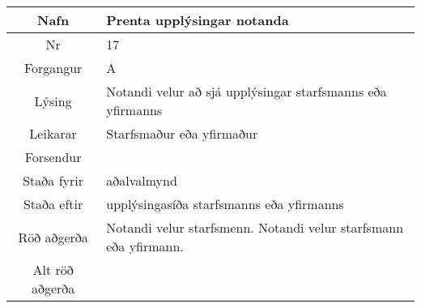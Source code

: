 \documentclass[a4paper]{article}
\begin{document}
\begin{tabular}{|c|p{10cm}|}
\hline
Nafn&Prenta upplýsingar notanda\\
\hline
Nr&17\\
\hline
Forgangur&A\\
\hline
Lýsing&Notandi velur að sjá upplýsingar starfsmanns eða yfirmanns\\
\hline
Leikarar&Starfsmaður eða yfirmaður\\
\hline
Forsendur&\\
\hline
Staða fyrir&aðalvalmynd\\
\hline
Staða eftir&upplýsingasíða starfsmanns eða yfirmanns\\
\hline
Röð aðgerða&Notandi velur starfsmenn. Notandi velur starfsmann eða yfirmann.\\
\hline
Alt röð aðgerða&\\
\hline
\end{tabular}
\end{document}
